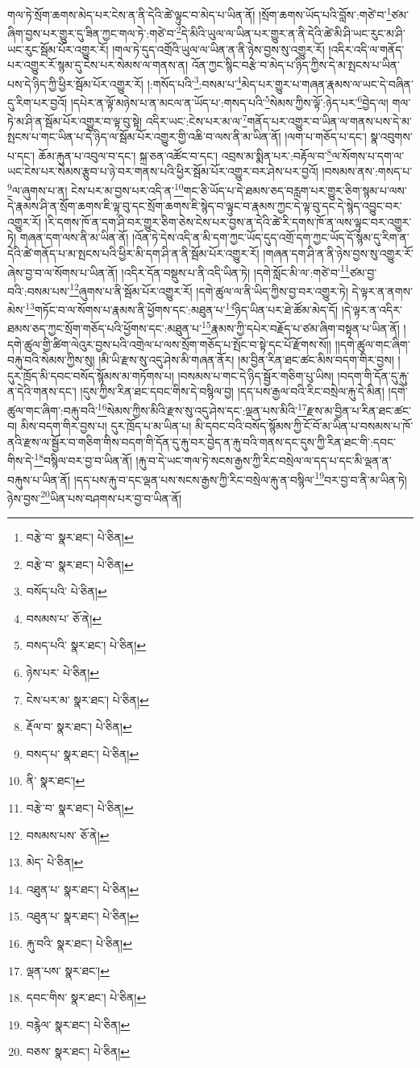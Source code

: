 གལ་ཏེ་སྲོག་ཆགས་མེད་པར་ངེས་ན་ནི་དེའི་ཚེ་ལྟུང་བ་མེད་པ་ཡིན་ནོ། །སྲོག་ཆགས་ཡོད་པའི་བློས་:གཙེ་བ་\footnote{བརྩེ་བ་  སྣར་ཐང་།  པེ་ཅིན། }ཙམ་ཞིག་བྱས་པར་གྱུར་དུ་ཟིན་ཀྱང་གལ་ཏེ་:གཙེ་བ་\footnote{བརྩེ་བ་  སྣར་ཐང་།  པེ་ཅིན། }དེ་མིའི་ཡུལ་ལ་ཡིན་པར་གྱུར་ན་ནི་དེའི་ཚེ་མི་ཤི་ཡང་རུང་མ་ཤི་ཡང་རུང་སྦོམ་པོར་འགྱུར་རོ། །གལ་ཏེ་དུད་འགྲོའི་ཡུལ་ལ་ཡིན་ན་ནི་ཉེས་བྱས་སུ་འགྱུར་རོ། །འདིར་འདི་ལ་གནོད་པར་འགྱུར་རོ་སྙམ་དུ་ངེས་པར་སེམས་ལ་གནས་ན། འོན་ཀྱང་སྙིང་བརྩེ་བ་མེད་པ་ཉིད་ཀྱིས་དེ་མ་སྤངས་པ་ཡིན་པས་དེ་ཉིད་ཀྱི་ཕྱིར་སྦོམ་པོར་འགྱུར་རོ། །:གསོད་པའི་\footnote{བསོད་པའི་  པེ་ཅིན། }:བསམ་པ་\footnote{བསམས་པ་  ཅོ་ནེ། }མེད་པར་གྱུར་པ་གཞན་རྣམས་ལ་ཡང་དེ་བཞིན་དུ་རིག་པར་བྱའོ། །དཔེར་ན་ལྟོ་མཉེས་པ་ན་མངལ་ན་ཡོད་པ་:གསད་པའི་\footnote{བསད་པའི་  སྣར་ཐང་།  པེ་ཅིན། }སེམས་ཀྱིས་ལྟོ་:ཉེད་པར་\footnote{ཉེས་པར་  པེ་ཅིན། }བྱེད་ལ། གལ་ཏེ་མ་ཤི་ན་སྦོམ་པོར་འགྱུར་བ་ལྟ་བུ་སྟེ། འདིར་ཡང་:ངེས་པར་མ་ལ་\footnote{ངེས་པར་མ་  སྣར་ཐང་།  པེ་ཅིན། }གནོད་པར་འགྱུར་བ་ཡིན་ལ་གནས་པས་དེ་མ་སྤངས་པ་གང་ཡིན་པ་དེ་ཉིད་ལ་སྦོམ་པོར་འགྱུར་གྱི་འཆི་བ་ལས་ནི་མ་ཡིན་ནོ། །ལག་པ་གཅོད་པ་དང་། སྣ་འབུགས་པ་དང་། ཆོམ་རྐུན་པ་འབུལ་བ་དང་། སྐྲ་ཅན་འཚོང་བ་དང་། འབྲས་མ་སྨིན་པར་:བརྟོལ་བ་\footnote{རྡོལ་བ་  སྣར་ཐང་།  པེ་ཅིན། }ལ་སོགས་པ་དག་ལ་ཡང་ངེས་པར་སེམས་རྩུབ་པ་ཉེ་བར་གནས་པའི་ཕྱིར་སྦོམ་པོར་འགྱུར་བར་ཤེས་པར་བྱའོ། །བསམས་ནས་:གསད་པ་\footnote{བསད་པ་  སྣར་ཐང་།  པེ་ཅིན། }ལ་ཞུགས་པ་ན། ངེས་པར་མ་བྱས་པར་འདི་ན་\footnote{ནི་  སྣར་ཐང་། }གང་ཅི་ཡོད་པ་དེ་ཐམས་ཅད་བརླག་པར་གྱུར་ཅིག་སྙམ་པ་ལས་དེ་རྣམས་ཤི་ན་སྲོག་ཆགས་ཇི་ལྟ་བུ་དང་སྲོག་ཆགས་ཇི་སྙེད་བ་ལྟུང་བ་རྣམས་ཀྱང་དེ་ལྟ་བུ་དང་དེ་སྙེད་འབྱུང་བར་འགྱུར་རོ། །རི་དགས་ཁོ་ན་དག་ཤི་བར་གྱུར་ཅིག་ཅེས་ངེས་པར་བྱས་ན་དེའི་ཚེ་རི་དགས་ཁོ་ན་ལས་ལྟུང་བར་འགྱུར་ཏེ། གཞན་དག་ལས་ནི་མ་ཡིན་ནོ། །འོན་ཏེ་དེས་འདི་ན་མི་དག་ཀྱང་ཡོད་དུད་འགྲོ་དག་ཀྱང་ཡོད་དོ་སྙམ་དུ་རིག་ན་དེའི་ཚེ་གནོད་པ་མ་སྤངས་པའི་ཕྱིར་མི་དག་ཤི་ན་ནི་སྦོམ་པོར་འགྱུར་རོ། །གཞན་དག་ཤི་ན་ནི་ཉེས་བྱས་སུ་འགྱུར་རོ་ཞེས་བྱ་བ་ལ་སོགས་པ་ཡིན་ནོ། །འདིར་དོན་བསྡུས་པ་ནི་འདི་ཡིན་ཏེ། །དགེ་སློང་མི་ལ་:གཙེ་བ་\footnote{བརྩེ་བ་  སྣར་ཐང་།  པེ་ཅིན། }ཙམ་བྱ་བའི་:བསམ་པས་\footnote{བསམས་པས་  ཅོ་ནེ། }ཞུགས་པ་ནི་སྦོམ་པོར་འགྱུར་རོ། །དགེ་ཚུལ་ལ་ནི་ཡིད་ཀྱིས་བྱ་བར་འགྱུར་ཏེ། དེ་ལྟར་ན་ནགས་མེས་\footnote{མེད་  པེ་ཅིན། }གཏོང་བ་ལ་སོགས་པ་རྣམས་ནི་ཕྱོགས་དང་:མཐུན་པ་\footnote{འཐུན་པ་  སྣར་ཐང་།  པེ་ཅིན། }ཉིད་ཡིན་པར་ཐེ་ཚོམ་མེད་དོ། །དེ་ལྟར་ན་འདིར་ཐམས་ཅད་ཀྱང་སྲོག་གཅོད་པའི་ཕྱོགས་དང་:མཐུན་པ་\footnote{འཐུན་པ་  སྣར་ཐང་།  པེ་ཅིན། }རྣམས་ཀྱི་དཔེར་བརྗོད་པ་ཙམ་ཞིག་བསྟན་པ་ཡིན་ནོ། །དགེ་ཚུལ་གྱི་ཚིག་ལེའུར་བྱས་པའི་འགྲེལ་པ་ལས་སྲོག་གཅོད་པ་སྤོང་བ་སྟེ་དང་པོ་རྫོགས་སོ།། །།དགེ་ཚུལ་གང་ཞིག་བརྐུ་བའི་སེམས་ཀྱིས་སུ། །མི་ཡི་རྫས་སུ་འདུ་ཤེས་མི་གཞན་ནོར། །མ་བྱིན་རིན་ཐང་ཚང་མིས་བདག་གིར་བྱས། །དུར་ཁྲོད་མི་དབང་བསོད་སྙོམས་མ་གཏོགས་པ། །བསམས་པ་གང་དེ་ཉིད་སྦྱོར་གཅིག་པུ་ཡིས། །བདག་གི་དོན་དུ་རྐུ་ན་དེའི་གནས་དང་། །དུས་ཀྱིས་རིན་ཐང་དབང་གིས་དེ་བསྙིལ་བྱ། །དད་པས་རྒྱལ་བའི་རིང་བསྲེལ་རྐུ་དེ་མིན། །དགེ་ཚུལ་གང་ཞིག་:བརྐུ་བའི་\footnote{རྐུ་བའི་  སྣར་ཐང་།  པེ་ཅིན། }སེམས་ཀྱིས་མིའི་རྫས་སུ་འདུ་ཤེས་དང་:ལྡན་པས་མིའི་\footnote{ལྡན་པས་  སྣར་ཐང་། }རྫས་མ་བྱིན་པ་རིན་ཐང་ཚང་བ། མིས་བདག་གིར་བྱས་པ། དུར་ཁྲོད་པ་མ་ཡིན་པ། མི་དབང་བའི་བསོད་སྙོམས་ཀྱི་ངོ་བོ་མ་ཡིན་པ་བསམས་པ་ཁོ་ནའི་རྫས་ལ་སྦྱོར་བ་གཅིག་གིས་བདག་གི་དོན་དུ་རྐུ་བར་བྱེད་ན་རྐུ་བའི་གནས་དང་དུས་ཀྱི་རིན་ཐང་གི་:དབང་གིས་དེ་\footnote{དབང་གིས་  སྣར་ཐང་།  པེ་ཅིན། }བསྙིལ་བར་བྱ་བ་ཡིན་ནོ། །རྐུ་བ་དེ་ཡང་གལ་ཏེ་སངས་རྒྱས་ཀྱི་རིང་བསྲེལ་ལ་དད་པ་དང་མི་ལྡན་ན་བརྐུས་པ་ཡིན་ནོ། །དད་པས་རྐུ་བ་དང་ལྡན་པས་སངས་རྒྱས་ཀྱི་རིང་བསྲེལ་རྐུ་ན་བསྙིལ་\footnote{བརྙེལ་  སྣར་ཐང་།  པེ་ཅིན། }བར་བྱ་བ་ནི་མ་ཡིན་ཏེ། ཉེས་བྱས་\footnote{བཅས་  སྣར་ཐང་།  པེ་ཅིན། }ཡིན་པས་བཤགས་པར་བྱ་བ་ཡིན་ནོ། 